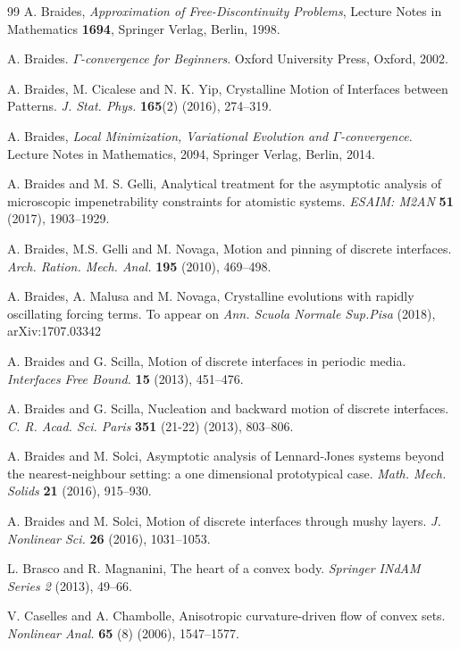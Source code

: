 \documentclass{interact}
\numberwithin{equation}{section}
\theoremstyle{definition}
\begin{document}
\begin{thebibliography} {99}
 A. Braides, \emph{Approximation of Free-Discontinuity Problems}, Lecture Notes in Mathematics {\bf 1694}, Springer Verlag, Berlin, 1998.

 A. Braides. 
{\em $\Gamma$-convergence for Beginners}.
Oxford University Press,  Oxford, 2002.

 A. Braides, M. Cicalese and N. K. Yip, Crystalline Motion of Interfaces between Patterns. \emph{J. Stat. Phys.} {\bf 165}(2) (2016), 274--319.

 A. Braides, \emph{Local Minimization, Variational Evolution and $\Gamma$-convergence}. Lecture Notes in Mathematics, 2094, Springer Verlag, Berlin, 2014.

 A. Braides and M. S. Gelli, Analytical treatment for the asymptotic analysis of microscopic impenetrability constraints for atomistic systems. \emph{ESAIM: M2AN} {\bf 51} (2017), 1903--1929. 

 A. Braides, M.S. Gelli and M. Novaga, Motion and pinning of discrete interfaces. \emph{Arch. Ration. Mech. Anal.} {\bf 195} (2010), 469--498.

 A. Braides, A. Malusa and M. Novaga, Crystalline evolutions with rapidly oscillating forcing terms. To appear on \emph{Ann. Scuola Normale Sup.Pisa} (2018), arXiv:1707.03342

 A. Braides and G. Scilla, Motion of discrete interfaces in periodic media. \emph{Interfaces Free Bound.} {\bf 15} (2013), 451--476.

 A. Braides and G. Scilla, Nucleation and backward motion of discrete interfaces. \emph{C. R. Acad. Sci. Paris } {\bf 351} (21-22) (2013), 803--806.

 A. Braides and M. Solci, Asymptotic analysis of Lennard-Jones systems beyond the nearest-neighbour setting: a one dimensional prototypical case. \emph{Math. Mech. Solids} {\bf 21} (2016), 915--930.

 A. Braides and M. Solci, Motion of discrete interfaces through mushy layers. \emph{J. Nonlinear Sci.} {\bf 26} (2016), 1031--1053.

 L. Brasco and R. Magnanini, The heart of a convex body. \emph{Springer INdAM Series 2} (2013), 49--66.

 V. Caselles and A. Chambolle, Anisotropic curvature-driven flow of convex sets. \emph{Nonlinear Anal.} {\bf 65} (8) (2006), 1547--1577.


\end{thebibliography}
\end{document}
